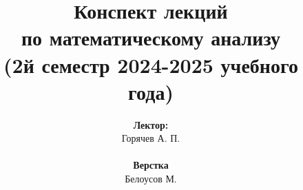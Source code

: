 \documentclass[../main.tex]{subfiles}
\begin{document}
\title{
    \bfseries
    {\Huge Конспект лекций\\ по математическому анализу}\\
    {\large (2й семестр 2024-2025 учебного года)}
}
\author{
    \textbf{Лектор:}\\ Горячев А. П.
    \\ ~ \\ 
    \textbf{Верстка}\\ Белоусов М.
}

\date{}
\maketitle
\setcounter{page}{2}
\end{document}
